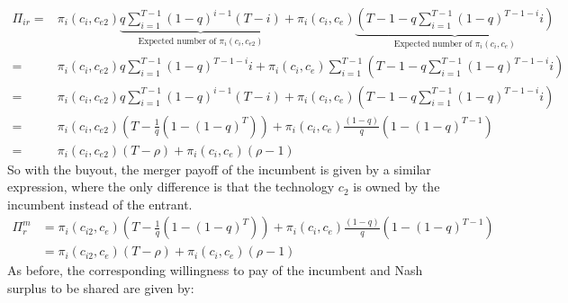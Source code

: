 \begin{align*}
\Pi_{ir} =& \pi_{i}(c_i,c_{e2}) \underbrace{q \sum_{i=1}^{T-1} (1-q)^{i-1} (T-i)}_{\text{Expected number of } \pi_{i}(c_i,c_{e2})}+ \pi_i(c_i,c_e) \underbrace{ (T-1-q \sum_{i=1}^{T-1} (1-q)^{T-1-i} i)}_{\text{Expected number of } \pi_{i}(c_i,c_{e})}
\\
=& \pi_{i}(c_i,c_{e2}) q \sum_{i=1}^{T-1} (1-q)^{T-1-i} i + \pi_i(c_i,c_e)  \sum_{i=1}^{T-1} (T-1-q \sum_{i=1}^{T-1} (1-q)^{T-1-i} i)
\\ =& \pi_{i}(c_i,c_{e2})q \sum_{i=1}^{T-1} (1-q)^{i-1} (T-i)+ \pi_i(c_i,c_e) (T-1-q \sum_{i=1}^{T-1} (1-q)^{T-1-i} i)
\\ =&\pi_{i}(c_i,c_{e2}) \left( T - \frac{1}{q} \left( 1-(1-q)^{T} \right) \right)
+ \pi_i(c_i,c_e) \frac{(1-q)}{q} \left( 1-(1-q)^{T-1} \right) \\ 
=&\pi_{i}(c_i,c_{e2}) \left( T - \rho \right)
+ \pi_i(c_i,c_e)  \left( \rho - 1 \right)
\end{align*}
So with the buyout, the merger payoff of the incumbent is given by a similar expression, where the only difference is that the technology $c_2$ is owned by the incumbent instead of the entrant. 
\begin{align*}
\Pi^m_r &= \pi_{i}(c_{i2},c_{e}) \left( T - \frac{1}{q} \left( 1-(1-q)^{T} \right) \right)
+\pi_i(c_i,c_e) \frac{(1-q)}{q} \left( 1-(1-q)^{T-1} \right) \\
&=\pi_{i}(c_{i2},c_{e}) \left( T - \rho \right)
+\pi_i(c_i,c_e) (\rho-1)
\end{align*}
As before, the corresponding willingness to pay of the incumbent and Nash surplus to be shared are given by: 

